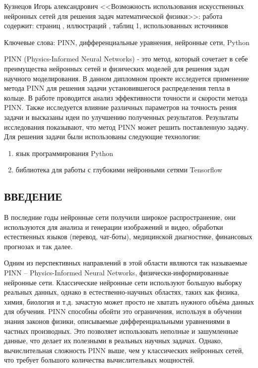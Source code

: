 \documentclass[a4paper,14pt]{extarticle} %
\begin{document}
Кузнецов Игорь александрович <<Возможность использования искусственных нейронных сетей для решения задач математической физики>>:  работа содержит: страниц , иллюстраций , таблиц 1, использованных источников 

\noindent Ключевые слова: PINN, дифференциальные уравнения, нейронные сети, Python %

PINN (Physics-Informed Neural Networks) - это метод, который сочетает в себе преимущества нейронных сетей и физических моделей для решения задач научного моделирования. В данном дипломном проекте исследуется применение метода PINN для решения задачи установившегося распределения тепла в кольце. В работе проводится анализ эффективности точности и скорости метода PINN. Также исследуется влияние различных параметров на точность рения задачи и высказаны идеи по улучшению полученных результатов. Результаты исследования показывают, что метод PINN может решить поставленную задачу. %
Для решения задачи были использованы следующие технологии:
\begin{enumerate}[label={\arabic*)}]
    \item язык программирования Python
    \item библиотека для работы с глубокими нейронными сетями Tensorflow
\end{enumerate}

\newpage
\tableofcontents

% 

\newpage
\begin{center} 
    \section*{ВВЕДЕНИЕ}
\end{center}

В последние годы нейронные сети получили широкое распространение, они используются для анализа и генерации изображений и видео, обработки естественных языков (перевод, чат-боты), медицинской диагностике, финансовых прогнозах и так далее.

Одним из перспективных направлений в этой области являются так называемые PINN -- Physics-Informed Neural Networks, физически-инфор\-мированные нейронные сети. Классические нейронные сети используют большую выборку реальных данных, однако в естественно-научных областях, таких как физика, химия, биология и т.д. зачастую может просто не хватать нужного объёма данных для обучения. PINN способны обойти это ограничения, используя в обучении знания законов физики, описываемые дифференциальными уравнениями в частных производных. Это позволяет использовать неполные и зашумленные данные, что делает их полезными в реальных научных задачах. Однако, вычислительная сложность PINN выше, чем у классических нейронных сетей, что требует большого количества вычислительных мощностей.
\end{document}

